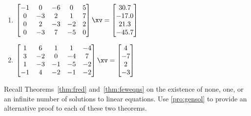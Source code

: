 \begin{exercise}
\begin{enumerate}
\item \(\begin{bmatrix} -1&0&-6&0&5
\\0&-3&2&1&7
\\0&2&-3&-2&2
\\0&-3&7&-5&0 \end{bmatrix}\xv
=\begin{bmatrix} 30.7
\\-17.0
\\21.3
\\-45.7 \end{bmatrix}\)
\setbox\ajrqrbox\hbox{}%
\marginpar{\usebox{\ajrqrbox\\[2ex]}}%


\item \(\begin{bmatrix} 1&6&1&1&-4
\\3&-2&0&-4&7
\\1&-3&-1&-5&-2
\\-1&4&-2&-1&-2 \end{bmatrix}\xv
=\begin{bmatrix} 4
\\-7
\\2
\\-3 \end{bmatrix}\)
\setbox\ajrqrbox\hbox{}%
\marginpar{\usebox{\ajrqrbox\\[2ex]}}%


%
%
\end{enumerate}
\end{exercise}




\begin{exercise} \label{ex:} 
Recall Theorems~\ref{thm:fred} and~\ref{thm:feweqns} on the existence of none, one, or an infinite number of solutions to linear equations.
Use \autoref{pro:gensol} to provide an alternative proof to each of these two theorems.
\end{exercise}





